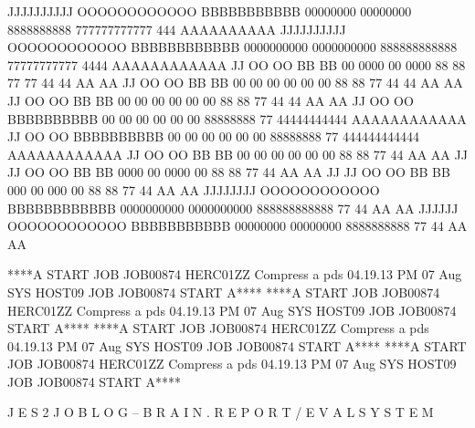 \documentclass[
11pt,
a4paper,
oneside
]{scrbook}
\begin{document}
{\begin{Printout}[
	form=ibm1403,
	paperheight=60,
	bandlines=3,
	feedlines=3,
	fitcolumns=132,
	linenumbers=true,
	punchholes=true,
	fontsize=\scriptsize
	]
  JJJJJJJJJJ  OOOOOOOOOOOO  BBBBBBBBBBB     00000000      00000000     8888888888   777777777777        444             AAAAAAAAAA 
  JJJJJJJJJJ  OOOOOOOOOOOO  BBBBBBBBBBBB   0000000000    0000000000   888888888888  77777777777        4444            AAAAAAAAAAAA
      JJ      OO        OO  BB        BB  00      0000  00      0000  88        88  77      77        44 44            AA        AA
      JJ      OO        OO  BB        BB  00     00 00  00     00 00  88        88         77        44  44            AA        AA
      JJ      OO        OO  BB       BB   00    00  00  00    00  00   88      88         77        44   44            AA        AA
      JJ      OO        OO  BBBBBBBBBB    00   00   00  00   00   00    88888888         77        44444444444         AAAAAAAAAAAA
      JJ      OO        OO  BBBBBBBBBB    00  00    00  00  00    00    88888888         77       444444444444         AAAAAAAAAAAA
      JJ      OO        OO  BB       BB   00 00     00  00 00     00   88      88        77              44            AA        AA
JJ    JJ      OO        OO  BB        BB  0000      00  0000      00  88        88       77              44            AA        AA
JJ    JJ      OO        OO  BB        BB  000       00  000       00  88        88       77              44            AA        AA
JJJJJJJJ      OOOOOOOOOOOO  BBBBBBBBBBBB   0000000000    0000000000   888888888888       77              44            AA        AA
 JJJJJJ       OOOOOOOOOOOO  BBBBBBBBBBB     00000000      00000000     8888888888        77              44            AA        AA


****A  START  JOB    JOB00874     HERC01ZZ   Compress a pds   04.19.13 PM 07 Aug  SYS    HOST09     JOB    JOB00874     START  A****
****A  START  JOB    JOB00874     HERC01ZZ   Compress a pds   04.19.13 PM 07 Aug  SYS    HOST09     JOB    JOB00874     START  A****
****A  START  JOB    JOB00874     HERC01ZZ   Compress a pds   04.19.13 PM 07 Aug  SYS    HOST09     JOB    JOB00874     START  A****
****A  START  JOB    JOB00874     HERC01ZZ   Compress a pds   04.19.13 PM 07 Aug  SYS    HOST09     JOB    JOB00874     START  A****


J E S 2   J O B   L O G  --  B R A I N . R E P O R T / E V A L  S Y S T E M


\end{Printout}}
\end{document}
